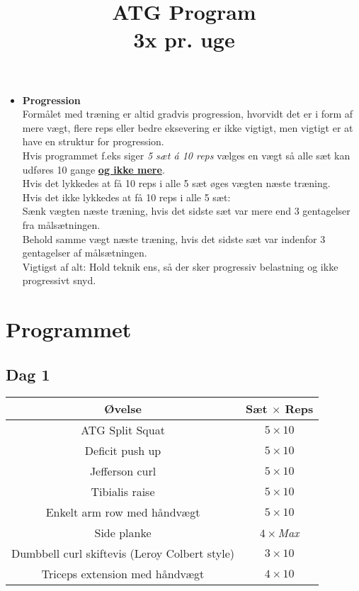 \documentclass[11pt]{article}
\title{\Huge ATG Program \\ \large 3x pr. uge}
\date{}
\begin{document}
\maketitle
\begin{tcolorbox}[title=\begin{center}Generelle noter\end{center}]
\begin{itemize}
\item \textbf{Progression} \\ Formålet med træning er altid gradvis progression, hvorvidt det er i form af mere vægt, flere reps eller bedre eksevering er ikke vigtigt, men vigtigt er at have en struktur for progression. \\
Hvis programmet f.eks siger \textit{5 sæt á 10 reps} vælges en vægt så alle sæt kan udføres 10 gange \textbf{\underline{og ikke mere}}. \\ Hvis det lykkedes at få 10 reps i alle 5 sæt øges vægten næste træning. \\ Hvis det ikke lykkedes at få 10 reps i alle 5 sæt: \\
Sænk vægten næste træning, hvis det sidste sæt var mere end 3 gentagelser fra målsætningen. \\
Behold samme vægt næste træning, hvis det sidste sæt var indenfor 3 gentagelser af målsætningen. \\
Vigtigst af alt: Hold teknik ens, så der sker progressiv belastning og ikke progressivt snyd.
\end{itemize}
\end{tcolorbox}
\section*{Programmet}
\subsection*{Dag 1}
\begin{center}
\begin{tabular}{|c|c|}
\hline
Øvelse & Sæt $\times$ Reps\\
\hline
ATG Split Squat & $5\times 10$\\
Deficit push up & $5\times10$\\
Jefferson curl & $5\times10$ \\
Tibialis raise & $5\times10$ \\
Enkelt arm row med håndvægt & $5\times10$\\
Side planke & $4\times$\textit{Max} \\
Dumbbell curl skiftevis (Leroy Colbert style) &  $3\times10$ \\
Triceps extension med håndvægt & $4\times 10$ \\
\hline
\end{tabular}
\end{center}
\end{document}
